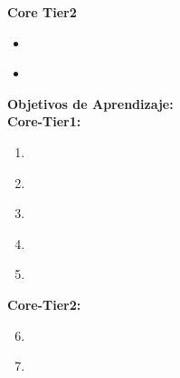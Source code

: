 \noindent \textbf{Core Tier2}
\begin{itemize}
	\item \DSDiscreteProbabilityTopicVariance\label{sec:BOK:DSDiscreteProbabilityTopicVariance}
	\item \DSDiscreteProbabilityTopicConditionalIndependence\label{sec:BOK:DSDiscreteProbabilityTopicConditionalIndependence}
\end{itemize}


\noindent \textbf{Objetivos de Aprendizaje:}\\
\noindent \textbf{Core-Tier1:}
\begin{enumerate}
	\setcounter{enumi}{0}
	\item \DSDiscreteProbabilityLOCalculate\xspace[\DSDiscreteProbabilityLOCalculateLevel]\label{sec:BOK:DSDiscreteProbabilityLOCalculate}
	\item \DSDiscreteProbabilityLODifferentiateBetween\xspace[\DSDiscreteProbabilityLODifferentiateBetweenLevel]\label{sec:BOK:DSDiscreteProbabilityLODifferentiateBetween}
	\item \DSDiscreteProbabilityLOIdentifyA\xspace[\DSDiscreteProbabilityLOIdentifyALevel]\label{sec:BOK:DSDiscreteProbabilityLOIdentifyA}
	\item \DSDiscreteProbabilityLOApplyBayes\xspace[\DSDiscreteProbabilityLOApplyBayesLevel]\label{sec:BOK:DSDiscreteProbabilityLOApplyBayes}
	\item \DSDiscreteProbabilityLOApplyTheProbability\xspace[\DSDiscreteProbabilityLOApplyTheProbabilityLevel]\label{sec:BOK:DSDiscreteProbabilityLOApplyTheProbability}
\end{enumerate}
\noindent \textbf{Core-Tier2:}
\begin{enumerate}
	\setcounter{enumi}{5}
	\item \DSDiscreteProbabilityLOComputeThe\xspace[\DSDiscreteProbabilityLOComputeTheLevel]\label{sec:BOK:DSDiscreteProbabilityLOComputeThe}
	\item \DSDiscreteProbabilityLOExplainHowAreBe\xspace[\DSDiscreteProbabilityLOExplainHowAreBeLevel]\label{sec:BOK:DSDiscreteProbabilityLOExplainHowAreBe}
\end{enumerate}




\section{\GV}\label{sec:BOK:GV}
\GVBOKDescription

